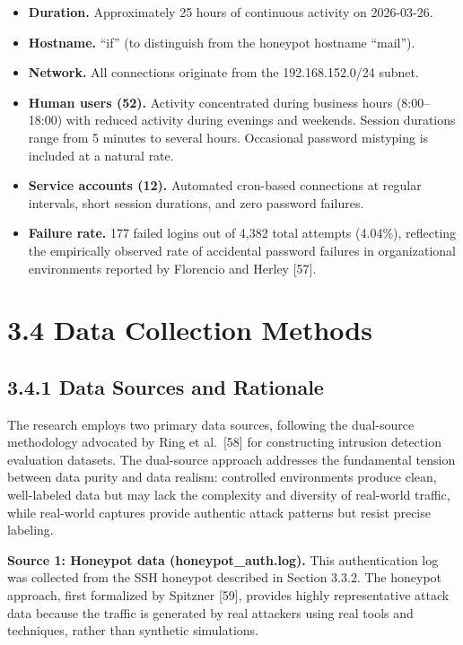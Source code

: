 \documentclass[
  a4paper]{report}
\providecommand{\tightlist}{%
  \setlength{\itemsep}{0pt}\setlength{\parskip}{0pt}}
\begin{document}
\begin{itemize}
\tightlist
\item
  \textbf{Duration.} Approximately 25 hours of continuous activity on
  2026-03-26.
\item
  \textbf{Hostname.} ``if'' (to distinguish from the honeypot hostname
  ``mail'').
\item
  \textbf{Network.} All connections originate from the 192.168.152.0/24
  subnet.
\item
  \textbf{Human users (52).} Activity concentrated during business hours
  (8:00--18:00) with reduced activity during evenings and weekends.
  Session durations range from 5 minutes to several hours. Occasional
  password mistyping is included at a natural rate.
\item
  \textbf{Service accounts (12).} Automated cron-based connections at
  regular intervals, short session durations, and zero password
  failures.
\item
  \textbf{Failure rate.} 177 failed logins out of 4,382 total attempts
  (4.04\%), reflecting the empirically observed rate of accidental
  password failures in organizational environments reported by Florencio
  and Herley {[}57{]}.
\end{itemize}

\section{3.4 Data Collection Methods}\label{data-collection-methods}

\subsection{3.4.1 Data Sources and
Rationale}\label{data-sources-and-rationale}

The research employs two primary data sources, following the dual-source
methodology advocated by Ring et al.~{[}58{]} for constructing intrusion
detection evaluation datasets. The dual-source approach addresses the
fundamental tension between data purity and data realism: controlled
environments produce clean, well-labeled data but may lack the
complexity and diversity of real-world traffic, while real-world
captures provide authentic attack patterns but resist precise labeling.

\textbf{Source 1: Honeypot data (honeypot\_auth.log).} This
authentication log was collected from the SSH honeypot described in
Section 3.3.2. The honeypot approach, first formalized by Spitzner
{[}59{]}, provides highly representative attack data because the traffic
is generated by real attackers using real tools and techniques, rather
than synthetic simulations.
\end{document}
